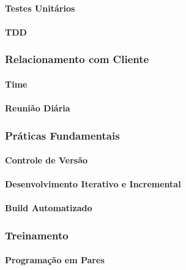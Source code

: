 \documentclass[
	article,			%
	11pt,				%
	oneside,			%
	a4paper,			%
	english,			%
	brazil,				%
	sumario=tradicional
	]{abntex2}
\begin{document}
\paragraph*{Testes Unitários}

\paragraph*{TDD}

\subsubsection*{Relacionamento com Cliente}

\paragraph*{Time}

\paragraph*{Reunião Diária}

\subsubsection*{Práticas Fundamentais}

\paragraph*{Controle de Versão}

\paragraph*{Desenvolvimento Iterativo e Incremental}

\paragraph*{Build Automatizado}


\subsubsection*{Treinamento}

\paragraph*{Programação em Pares}

% 
\end{document}

